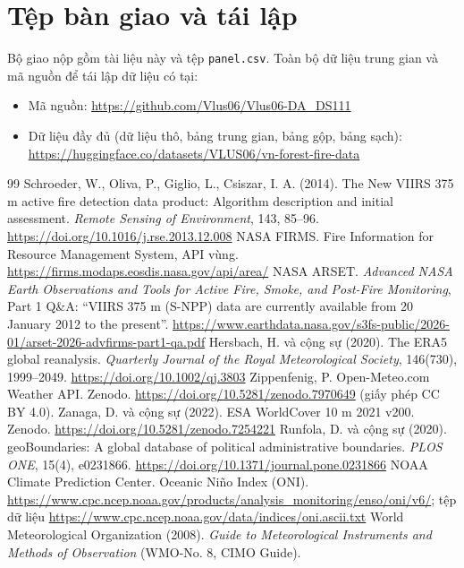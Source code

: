 \documentclass[12pt,a4paper]{article}
\begin{document}
\section{Tệp bàn giao và tái lập}

Bộ giao nộp gồm tài liệu này và tệp \texttt{panel.csv}. Toàn bộ dữ liệu trung gian và mã nguồn để tái lập dữ liệu có tại:
\begin{itemize}
\item Mã nguồn: \url{https://github.com/Vlus06/Vlus06-DA_DS111}
\item Dữ liệu đầy đủ (dữ liệu thô, bảng trung gian, bảng gộp, bảng sạch): \url{https://huggingface.co/datasets/VLUS06/vn-forest-fire-data}
\end{itemize}

\renewcommand{\refname}{Tài liệu tham khảo}
\begin{thebibliography}{99}
 Schroeder, W., Oliva, P., Giglio, L., Csiszar, I. A. (2014). The New VIIRS 375 m active fire detection data product: Algorithm description and initial assessment. \textit{Remote Sensing of Environment}, 143, 85--96. \url{https://doi.org/10.1016/j.rse.2013.12.008}
 NASA FIRMS. Fire Information for Resource Management System, API vùng. \url{https://firms.modaps.eosdis.nasa.gov/api/area/}
 NASA ARSET. \textit{Advanced NASA Earth Observations and Tools for Active Fire, Smoke, and Post-Fire Monitoring}, Part 1 Q\&A: ``VIIRS 375 m (S-NPP) data are currently available from 20 January 2012 to the present''. \url{https://www.earthdata.nasa.gov/s3fs-public/2026-01/arset-2026-advfirms-part1-qa.pdf}
 Hersbach, H. và cộng sự (2020). The ERA5 global reanalysis. \textit{Quarterly Journal of the Royal Meteorological Society}, 146(730), 1999--2049. \url{https://doi.org/10.1002/qj.3803}
 Zippenfenig, P. Open-Meteo.com Weather API. Zenodo. \url{https://doi.org/10.5281/zenodo.7970649} (giấy phép CC BY 4.0).
 Zanaga, D. và cộng sự (2022). ESA WorldCover 10 m 2021 v200. Zenodo. \url{https://doi.org/10.5281/zenodo.7254221}
 Runfola, D. và cộng sự (2020). geoBoundaries: A global database of political administrative boundaries. \textit{PLOS ONE}, 15(4), e0231866. \url{https://doi.org/10.1371/journal.pone.0231866}
 NOAA Climate Prediction Center. Oceanic Niño Index (ONI). \url{https://www.cpc.ncep.noaa.gov/products/analysis_monitoring/enso/oni/v6/}; tệp dữ liệu \url{https://www.cpc.ncep.noaa.gov/data/indices/oni.ascii.txt}
 World Meteorological Organization (2008). \textit{Guide to Meteorological Instruments and Methods of Observation} (WMO-No. 8, CIMO Guide).

\end{thebibliography}
\end{document}
